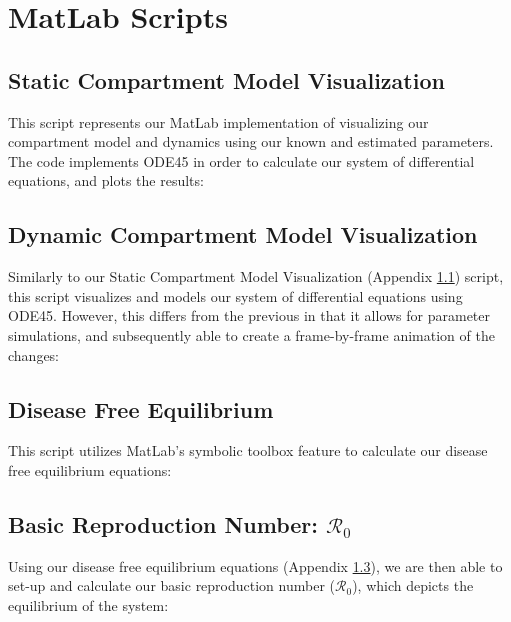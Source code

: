 \documentclass[12pt]{article}
\begin{document}
    \section{MatLab Scripts}
        \subsection{Static Compartment Model Visualization}
        \label{appendix:B1}
        This script represents our MatLab implementation of visualizing our compartment model and dynamics using our known and estimated parameters. The code implements ODE45 in order to calculate our system of differential equations, and plots the results:
        \begin{center}
            
        \end{center}
        
        \subsection{Dynamic Compartment Model Visualization}
        \label{appendix:B2}
        Similarly to our Static Compartment Model Visualization (Appendix \ref{appendix:B1}) script, this script visualizes and models our system of differential equations using ODE45. However, this differs from the previous in that it allows for parameter simulations, and subsequently able to create a frame-by-frame animation of the changes:
        \begin{center}
            
        \end{center}
        
        \subsection{Disease Free Equilibrium}
        \label{appendix:B3}
        This script utilizes MatLab's symbolic toolbox feature to calculate our disease free equilibrium equations:
        \begin{center}
            
        \end{center}
        
        \subsection{Basic Reproduction Number: $\mathscr{R}_0$}
        \label{appendix:B4}
        Using our disease free equilibrium equations (Appendix \ref{appendix:B3}), we are then able to set-up and calculate our basic reproduction number ($\mathscr{R}_0$), which depicts the equilibrium of the system:
        \begin{center}
            
        \end{center}
        
\end{document}
